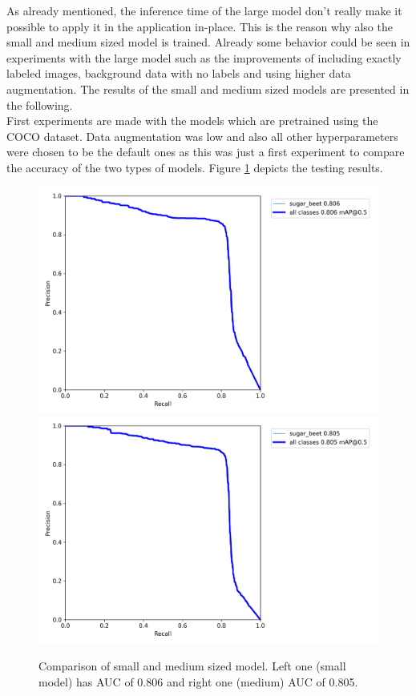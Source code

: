 As already mentioned, the inference time of the large model don't really make it possible to apply it in the application in-place. This is the reason why also the small and medium sized model is trained. Already some behavior could be seen in experiments with the large model such as the improvements of including exactly labeled images, background data with no labels and using higher data augmentation. The results of the small and medium sized models are presented in the following. \\

First experiments are made with the models which are pretrained using the COCO dataset. Data augmentation was low and also all other hyperparameters were chosen to be the default ones as this was just a first experiment to compare the accuracy of the two types of models. Figure \ref{fig:comparison_small_medium} depicts the testing results. 

\begin{figure}[htb!]
	\centering
	\includegraphics[scale=0.1]{figures/comp_small.png}
	\includegraphics[scale=0.1]{figures/comp_medium.png}
	\caption{Comparison of small and medium sized model. Left one (small model) has AUC of 0.806 and right one (medium) AUC of 0.805.}
	\label{fig:comparison_small_medium}
\end{figure}

